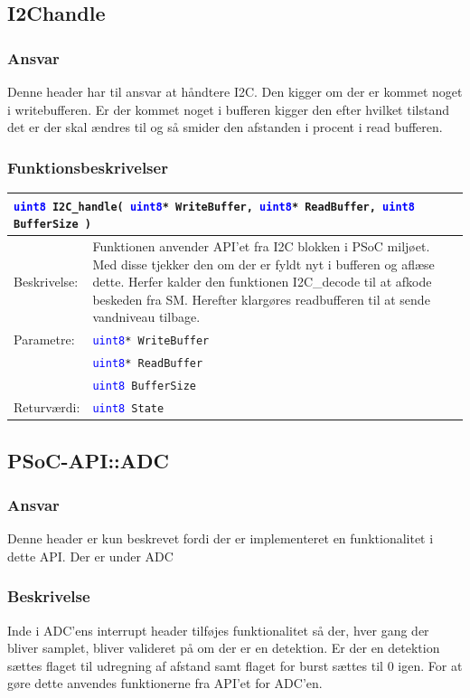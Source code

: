\subsection{I2Chandle}
\subsubsection{Ansvar}
Denne header har til ansvar at håndtere I2C. Den kigger om der er kommet noget i writebufferen. Er der kommet noget i bufferen kigger den efter hvilket tilstand det er der skal ændres til og så smider den afstanden i procent i read bufferen.
\subsubsection{Funktionsbeskrivelser}
\begin{table}[H]
\begin{tabular}{l p{12.5cm} }
\multicolumn{2}{l}{\texttt{\textcolor{blue}{uint8} I2C\_handle(  \texttt{\textcolor{blue}{uint8}* WriteBuffer}, 
\texttt{\textcolor{blue}{uint8}* ReadBuffer}, \texttt{\textcolor{blue}{uint8} BufferSize} )}} \\
\hline
Beskrivelse:& Funktionen anvender API'et fra I2C blokken i PSoC miljøet. Med disse tjekker den om der er fyldt nyt i bufferen og aflæse dette. Herfer kalder den funktionen I2C\_decode til at afkode beskeden fra SM. Herefter klargøres readbufferen til at sende vandniveau tilbage. \\
Parametre:&\texttt{\textcolor{blue}{uint8}* WriteBuffer}\\
&\texttt{\textcolor{blue}{uint8}* ReadBuffer}\\
&\texttt{\textcolor{blue}{uint8} BufferSize} \\
Returværdi:&\texttt{\textcolor{blue}{uint8} State}\\
\end{tabular}
\end{table}

\subsection{PSoC-API::ADC}
\subsubsection{Ansvar}
Denne header er kun beskrevet fordi der er implementeret en funktionalitet i dette API. Der er under ADC
\subsubsection{Beskrivelse}
Inde i ADC'ens interrupt header tilføjes funktionalitet så der, hver gang der bliver samplet, bliver valideret på om der er en detektion. Er der en detektion sættes flaget til udregning af afstand samt flaget for burst sættes til 0 igen. For at gøre dette anvendes funktionerne fra API'et for ADC'en.

